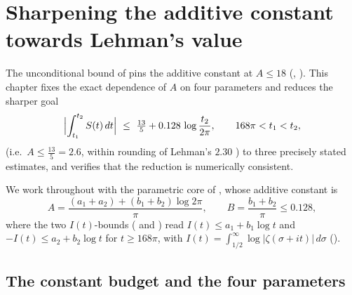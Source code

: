 
\chapter{Sharpening the additive constant towards Lehman's value}
\label{cha:lehman_sharp}

The unconditional bound of  pins the additive constant at
$A\le 18$ (, ).
This chapter fixes the exact dependence of $A$ on four parameters and reduces the
sharper goal
\[
  \Bigl|\int_{t_1}^{t_2}S(t)\,dt\Bigr|\ \le\ \tfrac{13}{5}+0.128\,\log\frac{t_2}{2\pi},
  \qquad 168\pi<t_1<t_2,
\]
(i.e.\ $A\le\tfrac{13}{5}=2.6$, within rounding of Lehman's $2.30$
\cite{Lehman1970}) to three precisely stated estimates, and verifies that the
reduction is numerically consistent.

We work throughout with the parametric core
 of ,
whose additive constant is
\begin{equation}
  A=\frac{(a_1+a_2)+(b_1+b_2)\log 2\pi}{\pi},
  \qquad
  B=\frac{b_1+b_2}{\pi}\le 0.128,
  \tag{Budget}
  \label{eq:ls_budget}
\end{equation}
where the two $I(t)$-bounds ( and ) read
$I(t)\le a_1+b_1\log t$ and $-I(t)\le a_2+b_2\log t$ for $t\ge 168\pi$, with
$I(t)=\int_{1/2}^\infty\log|\zeta(\sigma+it)|\,d\sigma$
().

\section{The constant budget and the four parameters}
\label{sec:ls_budget}


